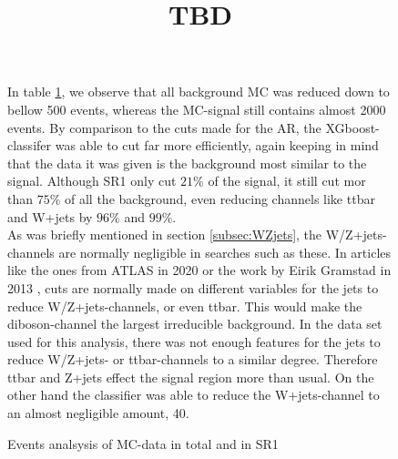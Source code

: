 \documentclass{article}
\begin{document}
\begin{figure}
\bgroup
In table \ref{table:SR1_R}, we observe that all background MC was reduced down to bellow 500 events, whereas the MC-signal still contains almost 2000 events. By comparison to the cuts made for the AR, the XGboost-classifer was able to cut far more efficiently, again keeping in mind that the data it was given is the background most similar to the signal. Although SR1 only cut $21\%$ of the signal, it still cut mor than $75\%$ of all the background, even reducing channels like ttbar and W+jets by $96\%$ and $99\%$.
\\
As was briefly mentioned in section \ref{subsec:WZjets}, the W/Z+jets-channels are normally negligible in searches such as these.  In articles like the ones from ATLAS in 2020 \cite{Aad_2020} or the work by Eirik Gramstad in 2013 \cite{Gramstad:2013loc}, cuts are normally made on different variables for the jets to reduce W/Z+jets-channels, or even ttbar. This would make the diboson-channel the largest irreducible background. In the data set used for this analysis, there was not enough features for the jets to reduce W/Z+jets- or ttbar-channels to a similar degree. Therefore ttbar and Z+jets effect the signal region more than usual. On the other hand the classifier was able to reduce the W+jets-channel to an almost negligible amount, 40. 
\title{TBD}
{\tabcolsep=20pt
\begin{table}
    \caption{Events analsysis of MC-data in total and in SR1}
    \centering 
    \begin{threeparttable}
    \end{threeparttable}
    \label{table:SR1_R}
\end{table}
}
\egroup
\end{figure}
\end{document}
